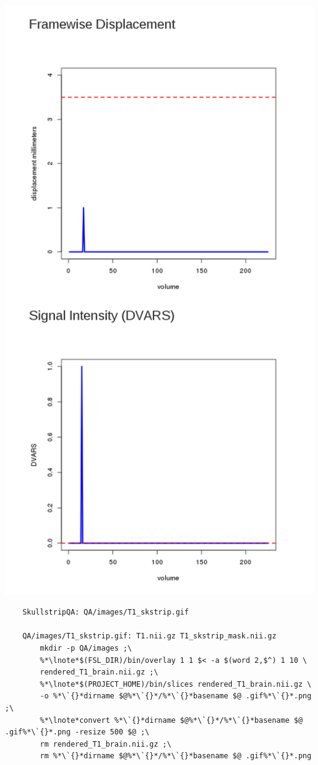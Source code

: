 \includegraphics[scale=0.3]{../images/QAmotion2.png}

\begin{lstlisting}
	SkullstripQA: QA/images/T1_skstrip.gif

	QA/images/T1_skstrip.gif: T1.nii.gz T1_skstrip_mask.nii.gz
		mkdir -p QA/images ;\
		%*\lnote*$(FSL_DIR)/bin/overlay 1 1 $< -a $(word 2,$^) 1 10 \
		rendered_T1_brain.nii.gz ;\
		%*\lnote*$(PROJECT_HOME)/bin/slices rendered_T1_brain.nii.gz \
		-o %*\`{}*dirname $@%*\`{}*/%*\`{}*basename $@ .gif%*\`{}*.png ;\
		%*\lnote*convert %*\`{}*dirname $@%*\`{}*/%*\`{}*basename $@ .gif%*\`{}*.png -resize 500 $@ ;\
		rm rendered_T1_brain.nii.gz ;\
		rm %*\`{}*dirname $@%*\`{}*/%*\`{}*basename $@ .gif%*\`{}*.png

\end{lstlisting}


